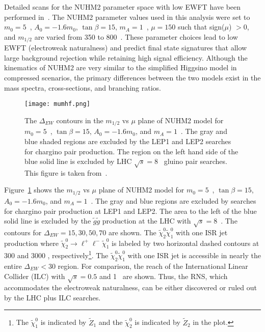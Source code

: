 Detailed scans for the NUHM2 parameter space with low EWFT have been performed in~\cite{Baer:2013xua}.
The NUHM2 parameter values used in this analysis were set to $m_{0} = 5$~{\TeV}, $A_{0} = -1.6 m_{0}$, $\tan\beta = 15$, $m_{A} = 1$~{\TeV}, $\mu = 150$ such that sign($\mu$) $> 0$, and $m_{1/2}$ are varied from 350 to 800~{\GeV}.
These parameter choices lead to low EWFT (electroweak naturalness) and predict final state signatures that allow large background rejection while retaining high signal efficiency.
Although the kinematics of NUHM2 are very similar to the simplified Higgsino model in compressed scenarios, the primary differences between the two models exist in the mass spectra, cross-sections, and branching ratios.

\begin{figure}[htb]
    \begin{center}
        \texttt{[image: mumhf.png]}
        \caption{The $\Delta_{EW}$ contours in the $m_{1/2}$ vs $\mu$ plane of NUHM2 model for $m_{0} =  5$~{\GeV}, $\tan\beta = 15$, $A_{0} = -1.6 m_{0}$, and $m_{A} = 1$~{\TeV}.
        The gray and blue shaded regions are excluded by the LEP1 and LEP2 searches for chargino pair production.
        The region on the left hand side of the blue solid line is excluded by LHC $\sqrt{s} = 8$~{\TeV} gluino pair searches.
        This figure is taken from~\cite{Baer:2016usl}.}
        \label{fig:susy_mumhf}
    \end{center}
\end{figure}

Figure~\ref{fig:susy_mumhf} shows the $m_{1/2}$ vs $\mu$ plane of NUHM2 model for $m_{0} =  5$~{\GeV}, $\tan\beta = 15$, $A_{0} = -1.6 m_{0}$, and $m_{A} = 1$~{\TeV}.
The gray and blue regions are excluded by searches for chargino pair production at LEP1 and LEP2.
The area to the left of the blue solid line is excluded by the $\widetilde{g} \widetilde{g}$ production at the LHC with $\sqrt{s} = 8$~{\TeV}.
The contours for $\Delta_{EW} = 15, 30, 50, 70$ are shown.
The $\widetilde{\chi}^{0}_{2} \widetilde{\chi}^{0}_{1}$ with one ISR jet production where $\widetilde{\chi}^{0}_{2} \to \ell^{+} \ell^{-} \widetilde{\chi}^{0}_{1}$ is labeled by two horizontal dashed contours at 300 \ifb and 3000 \ifb, respectively\footnote{The $\widetilde{\chi}^{0}_{1}$ is indicated by $\widetilde{Z}_{1}$ and the $\widetilde{\chi}^{0}_{2}$ is indicated by $\widetilde{Z}_{2}$ in the plot.}.
The $\widetilde{\chi}^{0}_{2} \widetilde{\chi}^{0}_{1}$ with one ISR jet is accessible in nearly the entire $\Delta_{EW} < 30$ region.
For comparison, the reach of the International Linear Collider (ILC) with $\sqrt{s} = 0.5$ and 1~{\TeV} are shown.
Thus, the RNS, which accommodates the electroweak naturalness, can be either discovered or ruled out by the LHC plus ILC searches.
